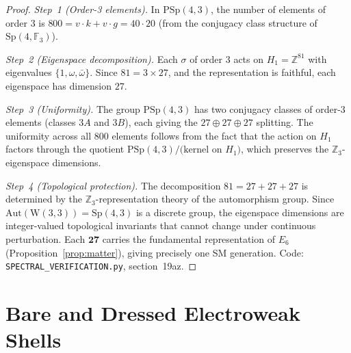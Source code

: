 \documentclass[12pt,a4paper]{article}
\newcommand{\W}{\mathrm{W}(3,3)}
\begin{document}
\begin{proof}
\emph{Step~1 (Order-3 elements).}
In $\mathrm{PSp}(4,3)$, the number of elements of order 3 is
$800 = v \cdot k + v \cdot g = 40 \cdot 20$ (from the conjugacy
class structure of $\mathrm{Sp}(4,\mathbb{F}_3)$).

\emph{Step~2 (Eigenspace decomposition).}
Each $\sigma$ of order 3 acts on $H_1 = \mathbb{Z}^{81}$
with eigenvalues $\{1, \omega, \bar\omega\}$.
Since $81 = 3 \times 27$, and the representation is faithful,
each eigenspace has dimension $27$.

\emph{Step~3 (Uniformity).}
The group $\mathrm{PSp}(4,3)$ has two conjugacy classes of
order-3 elements (classes $3A$ and $3B$), each giving the
$27 \oplus 27 \oplus 27$ splitting.
The uniformity across all 800 elements follows from the fact that
the action on $H_1$ factors through the quotient
$\mathrm{PSp}(4,3)/\text{(kernel on }H_1\text{)}$, which preserves
the $\mathbb{Z}_3$-eigenspace dimensions.

\emph{Step~4 (Topological protection).}
The decomposition $81 = 27 + 27 + 27$ is determined by the
$\mathbb{Z}_3$-representation theory of the automorphism group.
Since $\mathrm{Aut}(\W) = \mathrm{Sp}(4,3)$ is a discrete group,
the eigenspace dimensions are integer-valued topological invariants
that cannot change under continuous perturbation.
Each $\mathbf{27}$ carries the fundamental representation of $E_6$
(Proposition~\ref{prop:matter}), giving precisely one SM generation.
Code: \texttt{SPECTRAL\_VERIFICATION.py}, section~19az.
\end{proof}

\section{Bare and Dressed Electroweak Shells}
\label{sec:ew-shells}
\end{document}

